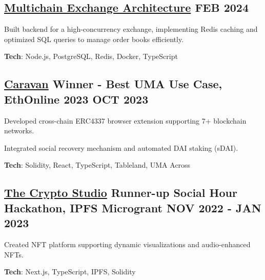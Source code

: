 \documentclass[letter,10pt]{article}
\begin{document}
\subsection{{ \href{https://github.com/Suhel-Kap/crypto-exchanger}{Multichain Exchange Architecture} \hfill FEB 2024}}
\begin{zitemize}
  \item Built backend for a high-concurrency exchange, implementing Redis caching and optimized SQL queries to manage order books efficiently.
  \item \textbf{Tech}: Node.js, PostgreSQL, Redis, Docker, TypeScript
\end{zitemize}

\subsection{{ \href{https://github.com/0xabh/caravan}{Caravan} Winner - Best UMA Use Case, EthOnline 2023 \hfill OCT 2023}}
\begin{zitemize}
  \item Developed cross-chain ERC4337 browser extension supporting 7+ blockchain networks.
  \item Integrated social recovery mechanism and automated DAI staking (sDAI).
  \item \textbf{Tech}: Solidity, React, TypeScript, Tableland, UMA Across
\end{zitemize}

\subsection{{ \href{https://github.com/Suhel-Kap/the-crypto-studio}{The Crypto Studio} Runner-up Social Hour Hackathon, IPFS Microgrant \hfill NOV 2022 - JAN 2023}}
\begin{zitemize}
  \item Created NFT platform supporting dynamic visualizations and audio-enhanced NFTs.
  \item \textbf{Tech}: Next.js, TypeScript, IPFS, Solidity
\end{zitemize}
\end{document}
